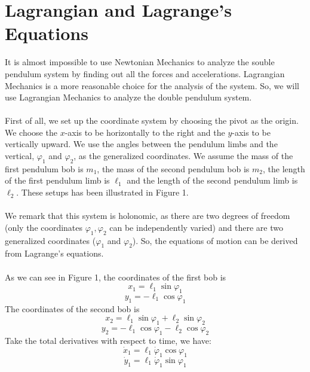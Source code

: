 \documentclass[11pt]{article}
\begin{document}
\section{Lagrangian and Lagrange's Equations}
It is almost impossible to use Newtonian Mechanics to analyze the souble pendulum system by finding out all the forces and
accelerations. Lagrangian Mechanics is a more reasonable choice for the analysis of the system. So, we will use Lagrangian
Mechanics to analyze the double pendulum system. \\
\\
First of all, we set up the coordinate system by choosing the pivot as the origin. We choose the \(x\)-axis to be horizontally
to the right and the \(y\)-axis to be vertically upward. We use the angles between the pendulum limbs and the vertical,
\(\varphi_1\) and \(\varphi_2\), as the generalized coordinates. We assume the mass of the first pendulum bob is \(m_1\),
the mass of the second pendulum bob is \(m_2\), the length of the first pendulum limb is \(\ell_1\) and the
length of the second pendulum limb is \(\ell_2\). These setups has been illustrated in Figure 1. \\
\\
We remark that this system is holonomic, as there are two degrees of freedom (only the coordinates \(\varphi_1, \varphi_2\) can
be independently varied) and there are two generalized coordinates (\(\varphi_1\) and \(\varphi_2\)). So, the equations of motion
can be derived from Lagrange's equations.\\
\\
As we can see in Figure 1, the coordinates of the first bob is
\begin{equation*}
  x_1 = \ell_1 \sin\varphi_1
\end{equation*}
\begin{equation*}
  y_1 = -\ell_1 \cos \varphi_1
\end{equation*}
The coordinates of the second bob is
\begin{equation*}
  x_2 = \ell_1 \sin \varphi_1 + \ell_2 \sin \varphi_2
\end{equation*}
\begin{equation*}
  y_2 = -\ell_1\cos\varphi_1 - \ell_2 \cos\varphi_2
\end{equation*}
Take the total derivatives with respect to time, we have:
\begin{equation*}
  \dot{x}_1 = \ell_1 \dot{\varphi}_1 \cos\varphi_1
\end{equation*}
\begin{equation*}
  \dot{y}_1 = \ell_1 \dot{\varphi}_1 \sin \varphi_1
\end{equation*}
\end{document}
